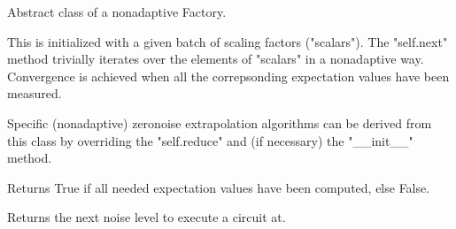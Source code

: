 \documentclass[letterpaper,10pt,english]{sphinxmanual}
\begin{document}
\begin{fulllineitems}
\label{\detokenize{index:mitiq.factories.BatchedFactory}}
Abstract class of a non\sphinxhyphen{}adaptive Factory.

This is initialized with a given batch of scaling factors ("scalars").
The "self.next" method trivially iterates over the elements of "scalars"
in a non\sphinxhyphen{}adaptive way.
Convergence is achieved when all the correpsonding expectation values have been measured.

Specific (non\sphinxhyphen{}adaptive) zero\sphinxhyphen{}noise extrapolation algorithms can be derived from this class by
overriding the "self.reduce" and (if necessary) the "\_\_init\_\_" method.

\begin{fulllineitems}
\label{\detokenize{index:mitiq.factories.BatchedFactory.is_converged}}
Returns True if all needed expectation values have been computed, else False.

\end{fulllineitems}


\begin{fulllineitems}
\label{\detokenize{index:mitiq.factories.BatchedFactory.next}}
Returns the next noise level to execute a circuit at.

\end{fulllineitems}


\end{fulllineitems}

\end{document}
